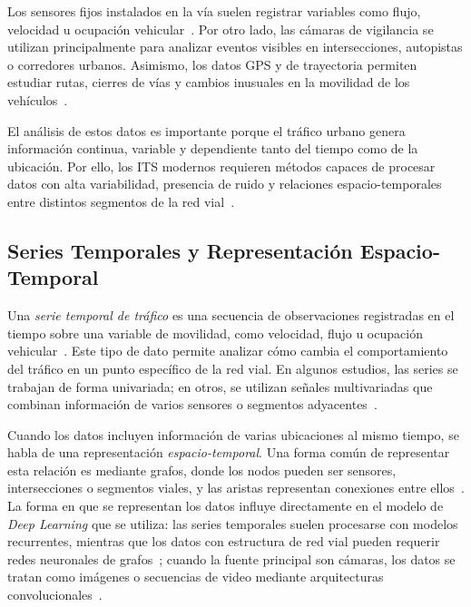 \documentclass[12pt, a4paper]{article}
\begin{document}
Los sensores fijos instalados en la v\'{i}a suelen registrar variables como flujo, velocidad u ocupaci\'{o}n vehicular~\cite{fang2020deep}. Por otro lado, las c\'{a}maras de vigilancia se utilizan principalmente para analizar eventos visibles en intersecciones, autopistas o corredores urbanos. Asimismo, los datos GPS y de trayectoria permiten estudiar rutas, cierres de v\'{i}as y cambios inusuales en la movilidad de los veh\'{i}culos~\cite{cai2021road}.

El an\'{a}lisis de estos datos es importante porque el tr\'{a}fico urbano genera informaci\'{o}n continua, variable y dependiente tanto del tiempo como de la ubicaci\'{o}n. Por ello, los ITS modernos requieren m\'{e}todos capaces de procesar datos con alta variabilidad, presencia de ruido y relaciones espacio-temporales entre distintos segmentos de la red vial~\cite{zhang2022automatic}.

\subsection{Series Temporales y Representaci\'{o}n Espacio-Temporal}

Una \textit{serie temporal de tr\'{a}fico} es una secuencia de observaciones registradas en el tiempo sobre una variable de movilidad, como velocidad, flujo u ocupaci\'{o}n vehicular~\cite{taheri2026applicability}. Este tipo de dato permite analizar c\'{o}mo cambia el comportamiento del tr\'{a}fico en un punto espec\'{i}fico de la red vial. En algunos estudios, las series se trabajan de forma univariada; en otros, se utilizan se\~{n}ales multivariadas que combinan informaci\'{o}n de varios sensores o segmentos adyacentes~\cite{jadhav2025multistage}.

Cuando los datos incluyen informaci\'{o}n de varias ubicaciones al mismo tiempo, se habla de una representaci\'{o}n \textit{espacio-temporal}. Una forma com\'{u}n de representar esta relaci\'{o}n es mediante grafos, donde los nodos pueden ser sensores, intersecciones o segmentos viales, y las aristas representan conexiones entre ellos~\cite{ren2024graph}. La forma en que se representan los datos influye directamente en el modelo de \textit{Deep Learning} que se utiliza: las series temporales suelen procesarse con modelos recurrentes, mientras que los datos con estructura de red vial pueden requerir redes neuronales de grafos~\cite{park2025graph}; cuando la fuente principal son c\'{a}maras, los datos se tratan como im\'{a}genes o secuencias de video mediante arquitecturas convolucionales~\cite{huang2020intelligent}.
\end{document}
